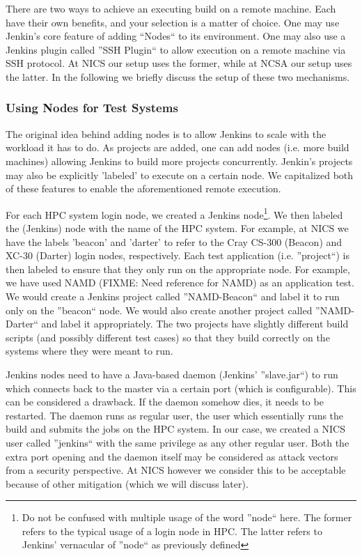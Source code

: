 \documentclass[10pt, conference, compsocconf]{IEEEtran}
\begin{document}
There are two ways to achieve an executing build on a remote machine. 
Each have their own benefits, and your selection is a matter of choice. 
One may use Jenkin's core feature of adding ``Nodes`` to its environment. 
One may also use a Jenkins plugin called ''SSH Plugin`` to allow execution on a remote machine via SSH protocol. 
At NICS our setup uses the former, while at NCSA our setup uses the latter. 
In the following we briefly discuss the setup of these two mechanisms.

\subsubsection{Using Nodes for Test Systems}
The original idea behind adding nodes is to allow Jenkins to scale with the workload it has to do. 
As projects are added, one can add nodes (i.e. more build machines) allowing Jenkins to build more projects concurrently. 
Jenkin's projects may also be explicitly 'labeled' to execute on a certain node. 
We capitalized both of these features to enable the aforementioned remote execution.

For each HPC system login node, we created a Jenkins node\footnote{Do not be confused with multiple usage of the word ''node`` here. 
The former refers to the typical usage of a login node in HPC. 
The latter refers to Jenkins' vernacular of ''node`` as previously defined}. 
We then labeled the (Jenkins) node with the name of the HPC system. 
For example, at NICS we have the labels 'beacon' and 'darter' to refer to the Cray CS-300 (Beacon) and XC-30 (Darter) login nodes, respectively. 
Each test application (i.e. ''project``) is then labeled to ensure that they only run on the appropriate node. 
For example, we have used NAMD (FIXME: Need reference for NAMD) as an application test. 
We would create a Jenkins project called ''NAMD-Beacon`` and label it to run only on the ''beacon`` node. 
We would also create another project called ''NAMD-Darter`` and label it appropriately. 
The two projects have slightly different build scripts (and possibly different test cases) so that they build correctly on the systems where they were meant to run.

Jenkins nodes need to have a Java-based daemon (Jenkins' ''slave.jar``) to run which connects back to the master via a certain port (which is configurable). 
This can be considered a drawback. 
If the daemon somehow dies, it needs to be restarted. 
The daemon runs as regular user, the user which essentially runs the build and submits the jobs on the HPC system. 
In our case, we created a NICS user called ''jenkins`` with the same privilege as any other regular user. 
Both the extra port opening and the daemon itself may be considered as attack vectors from a security perspective. 
At NICS however we consider this to be acceptable because of other mitigation (which we will discuss later).
\end{document}
